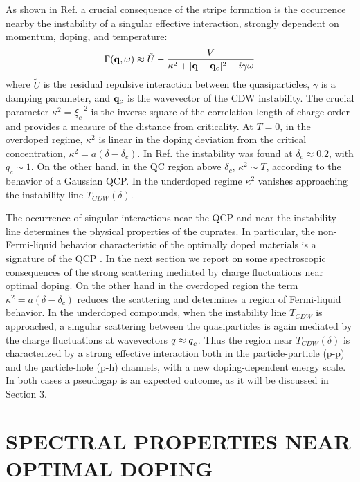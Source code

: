 \documentclass[twoside]{article}
\begin{document}
As shown in Ref. \cite{prl95,jpcs98} a crucial consequence of the stripe
formation
is the occurrence nearby the instability of a singular effective interaction,
strongly dependent on momentum, doping, and temperature:
\begin{equation}
\Gamma ({\bf q},\omega) \approx
\tilde{U} - \frac{V}{\kappa^{2}+ \vert{\bf q} - {\bf q}_c \vert^2 - i\gamma \omega}
\label{fitgamlr}
\end{equation}
where $\tilde{U}$ is the residual repulsive interaction between the
quasiparticles, $\gamma$ is a damping parameter, and ${\bf q}_c$ is the
wavevector of the CDW instability. The crucial parameter
$\kappa^2=\xi_c^{-2}$ is
the inverse square of the correlation length of charge
order and provides a measure of the distance from criticality.
At $T=0$, in the overdoped regime, $\kappa^2$ is linear in the
doping deviation from the critical concentration, $\kappa^2=a(\delta-
\delta_c)$. In Ref. \cite{prl95} the instability was found at
$\delta_c\approx 0.2$, with $q_c \sim 1$. On the other hand, in the QC region
above $\delta_c$, $\kappa^2\sim T$, according to the behavior of a Gaussian
QCP. In the underdoped regime $\kappa^2$ vanishes approaching the
instability line $T_{CDW}(\delta)$.

The occurrence of singular interactions near the QCP and near the
instability line determines the physical properties of the
cuprates. In particular, the non-Fermi-liquid behavior characteristic of the
optimally doped materials is a signature of the QCP \cite{prl95}. In the next
section we report on some spectroscopic
consequences of the strong scattering mediated by charge fluctuations near
optimal doping. On the other hand in the overdoped region the term
$\kappa^2=a(\delta-\delta_c)$ reduces the scattering and determines a region
of Fermi-liquid behavior. In the underdoped compounds, when the instability
line $T_{CDW}$ is approached, a singular scattering between the quasiparticles
is again mediated by the charge fluctuations at wavevectors
${\mbox{\bf $q$}} \approx{\mbox{\bf $q$}}_c$. Thus the region near
$T_{CDW}(\delta)$ is characterized by a strong effective interaction both in
the particle-particle (p-p) and the particle-hole (p-h) channels, with a new
doping-dependent energy scale. In both cases a pseudogap is an expected
outcome, as it will be discussed in Section 3.

\section{SPECTRAL PROPERTIES NEAR OPTIMAL DOPING}
\end{document}

